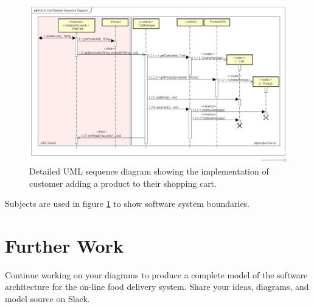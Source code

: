 \documentclass{csse4400}
\begin{document}
\begin{figure}[h!]
    \centering
    \begin{adjustwidth}{-11mm}{-11mm}
        \includegraphics[trim=35 70 31 49,clip,width=0.98\paperwidth]{../../notes/views/images/uml/detailed_sequence_diagram.png}
    \end{adjustwidth}
    \caption{Detailed UML sequence diagram showing the implementation of customer adding a product to their shopping cart.}
    \label{fig:uml_detailed_sequence}
\end{figure}

\filbreak
Subjects are used in figure \ref{fig:uml_detailed_sequence} to show software system boundaries.





\newpage
\section{Further Work}
Continue working on your diagrams to produce a complete model of the software architecture for the on-line food delivery system.
Share your ideas, diagrams, and model source on Slack.




\end{document}
